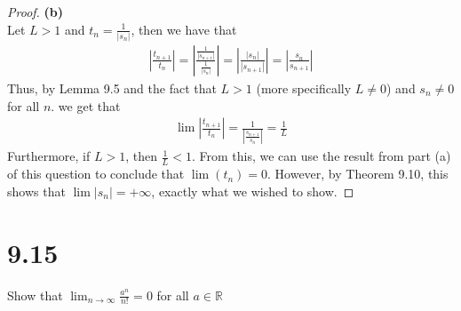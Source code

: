 \documentclass[10pt,a4paper]{article}
\theoremstyle{definition}
\begin{document}
\begin{proof}{\textbf{(b)}}
\\Let $L > 1$ and $\displaystyle t_n = \frac{1}{|s_n|}$, then we have that 
\begin{align*}
\left|\frac{t_{n + 1}}{t_n}\right| = \left|\frac{\frac{1}{|s_{n+1}|}}{\frac{1}{|s_n|}}\right| = \left|\frac{|s_n|}{|s_{n + 1}|}\right| = \left|\frac{s_n}{s_{n+1}}\right|
\end{align*}
Thus, by Lemma 9.5 and the fact that $L > 1$ (more specifically $L \neq 0$) and $s_n \neq 0$ for all $n$. we get that 
\begin{align*}
\lim \left|\frac{t_{n+1}}{t_n}\right| = \frac{1}{\left|\frac{s_{n + 1}}{s_n}\right|} = \frac{1}{L}
\end{align*}
Furthermore, if $L > 1$, then $\frac{1}{L} < 1$. From this, we can use the result from part (a) of this question to conclude that $\lim(t_n) = 0$. However, by Theorem 9.10, this shows that $\lim|s_n| = +\infty$, exactly what we wished to show. 
\end{proof}

\section*{9.15}
Show that $\displaystyle \lim_{n \to \infty} \frac{a^n}{n!} = 0$ for all $a \in \mathbb{R}$
\end{document}
